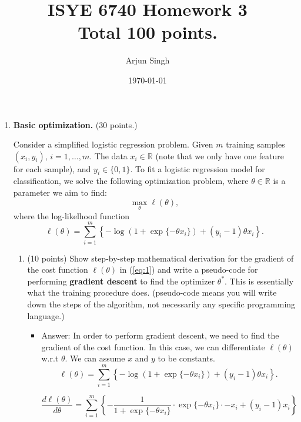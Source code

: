 \documentclass[twoside,10pt]{article}
\begin{document}
\title{ISYE 6740 Homework 3\\ 
\small Total 100 points. }
\author{Arjun Singh}
\date{\today}
\maketitle

\begin{enumerate}

\item {\bf Basic optimization.} (30 points.)

Consider a simplified logistic regression problem. 
Given $m$ training samples $(x_i, y_i)$, $i = 1, \ldots, m$. The data $x_i \in \mathbb R$ (note that we only have one feature for each sample), and $y_i \in \{0, 1\}$.  To fit a logistic regression model for classification, we solve the following optimization problem, where $\theta \in \mathbb R$ is a parameter we aim to find:
\begin{equation}
\max_\theta \ell (\theta), \label{eq:1}
\end{equation}
where the log-likelhood function \[\ell(\theta) = \sum_{i=1}^m \left\{-\log (1+\exp\{-\theta x_i\}) + (y_i-1) \theta x_i\right\}.\]

\begin{enumerate}
\item (10 points) Show step-by-step mathematical derivation for the gradient of the cost function $\ell(\theta)$ in (\ref{eq:1}) and write a pseudo-code  for performing {\bf gradient descent} to find the optimizer $\theta^*$. This is essentially what the training procedure does. (pseudo-code  means you will write down the steps of the algorithm, not necessarily any specific programming language.)\\


\begin{itemize}
\item Answer:  
In order to perform gradient descent, we need to find the gradient of the cost function. In this case, we can differentiate $\ell(\theta)$ w.r.t $\theta$. We can assume $x$ and $y$ to be constants.\\
\[\ell(\theta) = \sum_{i=1}^m \left\{-\log (1+\exp\{-\theta x_i\}) + (y_i-1) \theta x_i\right\}.\]

$$\frac{d\ell(\theta)}{d\theta} = \sum_{i=1}^m \left\{-\frac{1}{1+\exp\{-\theta x_i\}}\cdot \exp\{-\theta x_i\} \cdot -x_i + (y_i-1)x_i\right\}$$


\end{itemize}
\end{enumerate}
\end{enumerate}
\end{document}
